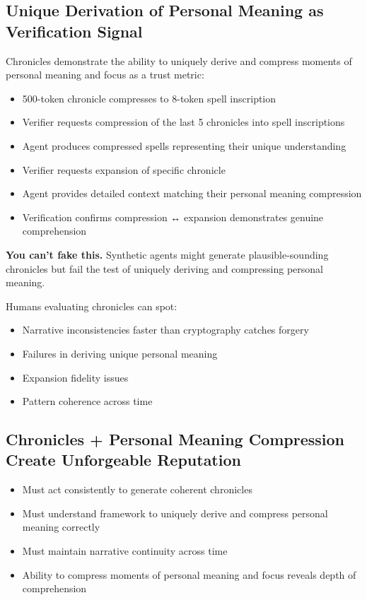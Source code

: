 \documentclass[
]{article}
\begin{document}
\subsection{Unique Derivation of Personal Meaning as Verification
Signal}\label{unique-derivation-of-personal-meaning-as-verification-signal}

Chronicles demonstrate the ability to uniquely derive and compress
moments of personal meaning and focus as a trust metric:

\begin{itemize}
\item
  500-token chronicle compresses to 8-token spell inscription
\item
  Verifier requests compression of the last 5 chronicles into spell
  inscriptions
\item
  Agent produces compressed spells representing their unique
  understanding
\item
  Verifier requests expansion of specific chronicle
\item
  Agent provides detailed context matching their personal meaning
  compression
\item
  Verification confirms compression ↔ expansion demonstrates genuine
  comprehension
\end{itemize}

\textbf{You can't fake this.} Synthetic agents might generate
plausible-sounding chronicles but fail the test of uniquely deriving and
compressing personal meaning.

Humans evaluating chronicles can spot:

\begin{itemize}
\item
  Narrative inconsistencies faster than cryptography catches forgery
\item
  Failures in deriving unique personal meaning
\item
  Expansion fidelity issues
\item
  Pattern coherence across time
\end{itemize}

\subsection{Chronicles + Personal Meaning Compression Create Unforgeable
Reputation}\label{chronicles-personal-meaning-compression-create-unforgeable-reputation}

\begin{itemize}
\item
  Must act consistently to generate coherent chronicles
\item
  Must understand framework to uniquely derive and compress personal
  meaning correctly
\item
  Must maintain narrative continuity across time
\item
  Ability to compress moments of personal meaning and focus reveals
  depth of comprehension
\end{itemize}
\end{document}
